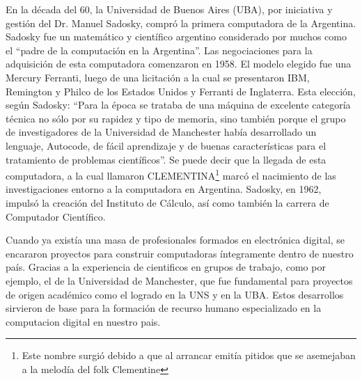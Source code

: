 \documentclass[%
 	final,
%
	notitlepage,
	narroweqnarray,
	inline,
 	twoside,
	]{ieee}
\begin{document}
En la d\'ecada del 60, la Universidad de Buenos Aires (UBA), por iniciativa y gesti\'on del Dr. Manuel Sadosky\cite{sadosky}, compr\'o la primera computadora de la Argentina. Sadosky fue un matem\'atico y cient\'ifico argentino considerado por muchos como el ``padre de la computaci\'on en la Argentina''.
Las negociaciones para la adquisici\'on de esta computadora comenzaron en 1958. El modelo elegido fue una Mercury Ferranti, luego de una licitaci\'on a la cual se presentaron IBM, Remington y Philco de los Estados Unidos y Ferranti de Inglaterra. Esta elecci\'on, seg\'un Sadosky: ``Para la \'epoca se trataba de una m\'aquina de excelente categor\'ia t\'ecnica no s\'olo por su rapidez y tipo de memoria, sino tambi\'en porque el grupo de investigadores de la Universidad de Manchester hab\'ia desarrollado un lenguaje, Autocode, de f\'acil aprendizaje y de buenas caracter\'isticas para el tratamiento de problemas cient\'ificos''.
Se puede decir que la llegada de esta computadora, a la cual llamaron CLEMENTINA\footnote{Este nombre surgi\'o debido a que al arrancar emit\'ia pitidos que se asemejaban a la melod\'ia del folk Clementine} marc\'o el nacimiento de las investigaciones entorno a la computadora en Argentina.
Sadosky, en 1962, impuls\'o la creaci\'on del Instituto de C\'alculo, as\'i como tambi\'en la carrera de Computador Cient\'ifico.

Cuando ya exist\'ia una masa de profesionales formados en electr\'onica digital, se encararon proyectos para construir computadoras \'integramente dentro de nuestro pa\'is. Gracias a la experiencia de cientificos en grupos de trabajo, como por ejemplo, el de la Universidad de Manchester, que fue fundamental para proyectos de origen acad\'emico como el logrado en la UNS y en la UBA. Estos desarrollos sirvieron de base para la formaci\'on de recurso humano especializado en la computacion digital en nuestro pais.



\end{document}
